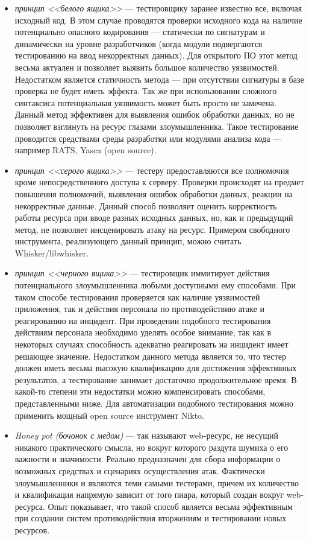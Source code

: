 \documentclass[10pt, a5paper]{article}
\begin{document}
\begin{itemize}
  \item \emph{принцип <<белого ящика>>} --- тестировщику заранее известно все, включая исходный код. В этом случае проводятся проверки исходного кода на наличие потенциально опасного кодирования --- статически по сигнатурам и динамически на уровне разработчиков (когда модули подвергаются тестированию на ввод некорректных данных).  Для открытого ПО этот метод весьма актуален и позволяет выявить большое количество уязвимостей. Недостатком является статичность метода --- при отсутствии сигнатуры в базе проверка не будет иметь эффекта. Так же при использовании сложного синтаксиса потенциальная уязвимость может быть просто не замечена. Данный метод эффективен для выявления ошибок обработки данных, но не позволяет взглянуть на ресурс глазами злоумышленника. Такое тестирование проводится средствами среды разработки или модулями анализа кода --- например RATS, Yasca (open source).
  \item \emph{принцип <<серого ящика>>} --- тестеру предоставляются все полномочия кроме непосредственного доступа к серверу. Проверки происходят на предмет повышения полномочий, выявления ошибок обработки данных, реакции на некорректные данные. Данный способ позволяет  оценить корректность работы ресурса при вводе разных исходных данных, но, как и предыдущий метод, не позволяет инсценировать атаку на ресурс. Примером свободного инструмента, реализующего данный принцип, можно считать Whisker/libwhisker.
  \item \emph{принцип <<черного ящика>>} --- тестировщик иммитирует действия потенциального злоумышленника любыми доступными ему способами. При таком способе тестирования проверяется как наличие уязвимостей приложения, так и действия персонала по противодействию атаке и реагированию на инцидент. При проведении подобного тестирования действиям персонала необходимо уделять особое внимание, так как в некоторых случаях способность адекватно реагировать на инцидент имеет решающее значение. Недостатком данного метода является то, что тестер должен иметь весьма высокую квалификацию для достижения эффективных результатов, а тестирование занимает достаточно продолжительное время. В какой-то степени эти недостатки можно компенсировать способами, представленными ниже. Для автоматизации подобного тестирования можно применить мощный open source инструмент Nikto.
  \item \emph{Honey pot (бочонок с медом)} --- так называют web-ресурс, не несущий никакого практического смысла, но вокруг которого раздута шумиха о его важности и значимости. Реально предназначен для сбора информации о возможных средствах и сценариях осуществления атак. Фактически злоумышленники и являются теми самыми тестерами, причем их количество и квалификация напрямую зависит от того пиара, который создан вокруг web-ресурса. Опыт показывает, что такой способ является весьма эффективным при создании систем противодействия вторжениям и тестировании новых ресурсов.

\end{itemize}
\end{document}
